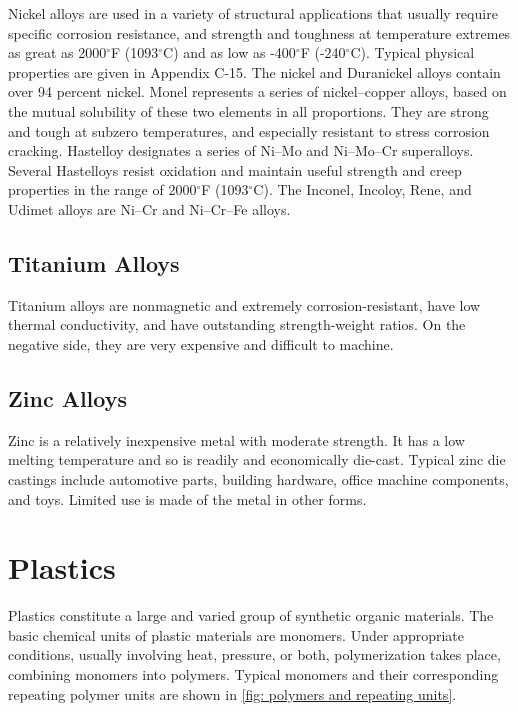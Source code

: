 \documentclass[
10pt,
a4paper,
openany,
svgnames,
]{book}
\begin{document}
Nickel alloys are used in a variety of structural applications that usually require specific corrosion resistance, and strength and toughness at temperature extremes as great as 2000$^{\circ}$F (1093$^{\circ}$C) and as low as -400$^{\circ}$F (-240$^{\circ}$C). Typical physical properties are given in Appendix C-15. The nickel and Duranickel alloys contain over 94 percent nickel. Monel represents a series of nickel–copper alloys, based on the mutual solubility of these two elements in all proportions. They are strong and tough at subzero temperatures, and especially resistant to stress corrosion cracking. Hastelloy designates a series of Ni–Mo and Ni–Mo–Cr superalloys. Several Hastelloys resist oxidation and maintain useful strength and creep properties in the range of 2000$^{\circ}$F (1093$^{\circ}$C). The Inconel, Incoloy, Rene, and Udimet alloys are Ni–Cr and Ni–Cr–Fe alloys. 

\subsection{Titanium Alloys}

Titanium alloys are nonmagnetic and extremely corrosion-resistant, have low thermal conductivity, and have outstanding strength-weight ratios. On the negative side, they are very expensive and difficult to machine. 

\subsection{Zinc Alloys}

Zinc is a relatively inexpensive metal with moderate strength. It has a low melting temperature and so is readily and economically die-cast. Typical zinc die castings include automotive parts, building hardware, office machine components, and toys. Limited use is made of the metal in other forms.

\section{Plastics}

Plastics constitute a large and varied group of synthetic organic materials. The basic chemical units of plastic materials are monomers. Under appropriate conditions, usually involving heat, pressure, or both, polymerization takes place, combining monomers into polymers. Typical monomers and their corresponding repeating polymer units are shown in \cref{fig: polymers and repeating units}.
\end{document}
